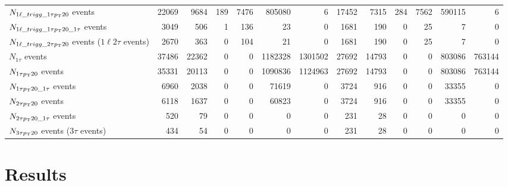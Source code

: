 \documentclass[letterpaper,12pt]{article}
\begin{document}
\begin{table}
{\begin{tabular}{l|rr|rrrr|rr|rrrr}
      $N_{1\ell\_trigg\_1\tau p_{\mathrm{T}}20}$ events & 22069 & 9684 & 189 & 7476 & 805080 & 6 & 17452 & 7315 & 284 & 7562 & 590115 & 6\\
      $N_{1\ell\_trigg\_1\tau p_{\mathrm{T}}20\_1\tau}$ events & 3049 & 506 & 1 & 136 & 23 & 0 & 1681 & 190 & 0 & 25 & 7 & 0\\
      $N_{1\ell\_trigg\_2\tau p_{\mathrm{T}}20}$ events ($1\ell2\tau$ events) & 2670 & 363 & 0 & 104 & 21 & 0 & 1681 & 190 & 0 & 25 & 7 & 0\\
      $N_{1\tau}$ events & 37486 & 22362 & 0 & 0 & 1182328 & 1301502 & 27692 & 14793 & 0 & 0 & 803086 & 763144\\
      $N_{1\tau p_{\mathrm{T}}20}$ events & 35331 & 20113 & 0 & 0 & 1090836 & 1124963 & 27692 & 14793 & 0 & 0 & 803086 & 763144\\
      $N_{1\tau p_{\mathrm{T}}20\_1\tau}$ events & 6960 & 2038 & 0 & 0 & 71619 & 0 & 3724 & 916 & 0 & 0 & 33355 & 0\\
      $N_{2\tau p_{\mathrm{T}}20}$ events & 6118 & 1637 & 0 & 0 & 60823 & 0 & 3724 & 916 & 0 & 0 & 33355 & 0\\
      $N_{2\tau p_{\mathrm{T}}20\_1\tau}$ events & 520 & 79 & 0 & 0 & 0 & 0 & 231 & 28 & 0 & 0 & 0 & 0\\
      $N_{3\tau p_{\mathrm{T}}20}$ events ($3\tau$ events) & 434 & 54 & 0 & 0 & 0 & 0 & 231 & 28 & 0 & 0 & 0 & 0\\
      \hline
      \hline	
    \end{tabular}%
  }
  \caption{}
  \label{tab:cutflow}
\end{table}

\section{Results}
\label{sec:results}
\end{document}
